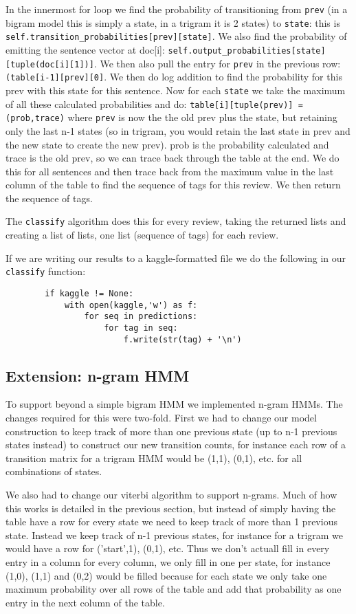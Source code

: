\documentclass{article}
\begin{document}
In the innermost for loop we find the probability of transitioning from \texttt{prev} (in a bigram model this is simply a state, in a trigram it is 2 states) to \texttt{state}: this is \texttt{self.transition\_probabilities[prev][state]}. We also find the probability of emitting the sentence vector at doc[i]: \texttt{self.output\_probabilities[state][tuple(doc[i][1])]}. We then also pull the entry for \texttt{prev} in the previous row: \texttt{(table[i-1][prev][0]}. We then do log addition to find the probability for this prev with this state for this sentence. Now for each \texttt{state} we take the maximum of all these calculated probabilities and do: \texttt{table[i][tuple(prev)] = (prob,trace)} where \texttt{prev} is now the the old prev plus the state, but retaining only the last n-1 states (so in trigram, you would retain the last state in prev and the new state to create the new prev). prob is the probability calculated and trace is the old prev, so we can trace back through the table at the end. We do this for all sentences and then trace back from the maximum value in the last column of the table to find the sequence of tags for this review. We then return the sequence of tags. 

The \texttt{classify} algorithm does this for every review, taking the returned lists and creating a list of lists, one list (sequence of tags) for each review. 

If we are writing our results to a kaggle-formatted file we do the following in our \texttt{classify} function: 
\begin{verbatim}
        if kaggle != None:
            with open(kaggle,'w') as f:
                for seq in predictions:
                    for tag in seq:
                        f.write(str(tag) + '\n')
\end{verbatim}

\subsection*{Extension: n-gram HMM}

To support beyond a simple bigram HMM we implemented n-gram HMMs. The changes required for this were two-fold. First we had to change our model construction to keep track of more than one previous state (up to n-1 previous states instead) to construct our new transition counts, for instance each row of a transition matrix for a trigram HMM would be (1,1), (0,1), etc. for all combinations of states. 

We also had to change our viterbi algorithm to support n-grams. Much of how this works is detailed in the previous section, but instead of simply having the table have a row for every state we need to keep track of more than 1 previous state. Instead we keep track of n-1 previous states, for instance for a trigram we would have a row for ('start',1), (0,1), etc. Thus we don't actuall fill in every entry in a column for every column, we only fill in one per state, for instance (1,0), (1,1) and (0,2) would be filled because for each state we only take one maximum probability over all rows of the table and add that probability as one entry in the next column of the table. 
\end{document}
